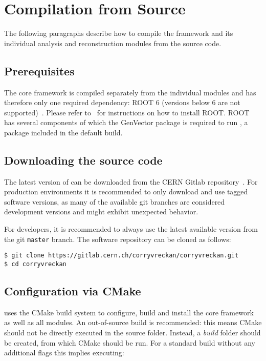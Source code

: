 \section{Compilation from Source}

The following paragraphs describe how to compile the \corry framework and its individual analysis and reconstruction modules from the source code.

\subsection{Prerequisites}
\label{sec:prerequisites}
The core framework is compiled separately from the individual modules and \corry has therefore only one required dependency: ROOT 6 (versions below 6 are not supported)~\cite{root}.
Please refer to~\cite{rootinstallation} for instructions on how to install ROOT.
ROOT has several components of which the GenVector package is required to run \corry, a package included in the default build.

\subsection{Downloading the source code}
The latest version of \corry can be downloaded from the CERN Gitlab repository~\cite{corry-repo}.
For production environments it is recommended to only download and use tagged software versions, as many of the available git branches are considered development versions and might exhibit unexpected behavior.

For developers, it is recommended to always use the latest available version from the git \texttt{master} branch.
The software repository can be cloned as follows:

\begin{verbatim}
$ git clone https://gitlab.cern.ch/corryvreckan/corryvreckan.git
$ cd corryvreckan
\end{verbatim}

\subsection{Configuration via CMake}
\label{sec:cmake_config}
\corry uses the CMake build system to configure, build and install the core framework as well as all modules.
An out-of-source build is recommended: this means CMake should not be directly executed in the source folder.
Instead, a \textit{build} folder should be created, from which CMake should be run.
For a standard build without any additional flags this implies executing:

